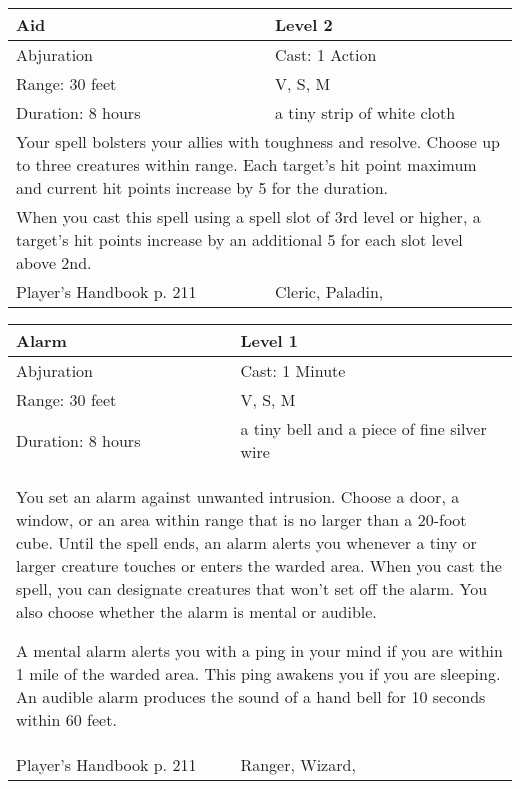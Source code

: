 \documentclass[11pt]{report}
\begin{document}
\begin{table}[H]
	\begin{tabular}{||p{6cm}|p{6cm}||}
		\hline\hline
		\bf{Aid} & Level 2\\ \hline
		Abjuration & Cast: 1 Action\\ \hline
		Range: 30 feet & V, S, M\\ \hline
		Duration: 8 hours & a tiny strip of white cloth\\ \hline
		\multicolumn{2}{||p{12cm}||}{Your spell bolsters your allies with toughness and resolve. 
Choose up to three creatures within range. Each target’s hit point maximum and current hit points increase by 5 for the duration.}\\ \hline
		\multicolumn{2}{||p{12cm}||}{When you cast this spell using a spell slot of 3rd level or higher, a target’s hit points increase by an additional 5 for each slot level above 2nd.}\\ \hline
Player's Handbook p. 211 & Cleric, Paladin, \\ \hline\hline
	\end{tabular}
\end{table}

\begin{table}[H]
	\begin{tabular}{||p{6cm}|p{6cm}||}
		\hline\hline
		\bf{Alarm} & Level 1\\ \hline
		Abjuration & Cast: 1 Minute\\ \hline
		Range: 30 feet & V, S, M\\ \hline
		Duration: 8 hours & a tiny bell and a piece of fine silver wire\\ \hline
		\multicolumn{2}{||p{12cm}||}{You set an alarm against unwanted intrusion. 
Choose a door, a window, or an area within range that is no larger than a 20-foot cube. Until the spell ends, an alarm alerts you whenever a tiny or larger creature touches or enters the warded area. When you cast the spell, you can designate creatures that won’t set off the alarm. You also choose whether the alarm is mental or audible. 

A mental alarm alerts you with a ping in your mind if you are within 1 mile of the warded area. This ping awakens you if you are sleeping. 
An audible alarm produces the sound of a hand bell for 10 seconds within 60 feet.}\\ \hline
Player's Handbook p. 211 & Ranger, Wizard, \\ \hline\hline
	\end{tabular}
\end{table}
\end{document}

